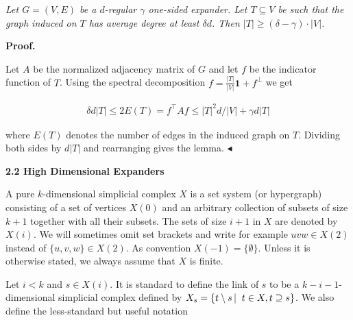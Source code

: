 \emph{Let $G=(V,E)$ be a $d$-regular $\gamma$ one-sided expander. Let $T\subseteq V$ be such that the graph induced on $T$ has average degree at least $\delta d$. Then $|T|\geq(\delta-\gamma)\cdot|V|$.}\par






\par\medskip\noindent\textbf{Proof.}\par




Let $A$ be the normalized adjacency matrix of $G$ and let $f$ be the indicator function of $T$. Using the spectral decomposition $f=\frac{|T|}{|V|}{\mathbf{1}}+f^{\perp}$ we get\par


\[\begin{gathered}
\delta d|T|\leq 2E(T)=f^{\top}Af\leq\lvert T\rvert^{2}d/|V|+\gamma d\lvert T\rvert
\end{gathered}\]


where $E(T)$ denotes the number of edges in the induced graph on $T$.
Dividing both sides by $d|T|$ and rearranging gives the lemma.
$\blacktriangleleft$\par






\par\medskip\noindent\textbf{
2.2 High Dimensional Expanders}\par




A pure $k$-dimensional simplicial complex $X$ is a set system (or hypergraph) consisting of a set of vertices $X(0)$ and an arbitrary collection of subsets of size $k+1$ together with all their subsets. The sets of size $i+1$ in $X$ are denoted by $X(i)$. We will sometimes omit set brackets and write for example $uvw\in X(2)$ instead of $\{u,v,w\}\in X(2)$. As convention $X(-1)=\{\emptyset\}$. Unless it is otherwise stated, we always assume that $X$ is finite.\par




Let $i<k$ and $s\in X(i)$. It is standard to define the link of $s$ to be a $k-i-1$-dimensional simplicial complex defined by
$X_{s}=\left\{t\setminus s\left|\;\vphantom{t\setminus st\in X,t\supseteq s}\right.t\in X,t\supseteq s\right\}$. We also define the less-standard but useful notation\par



